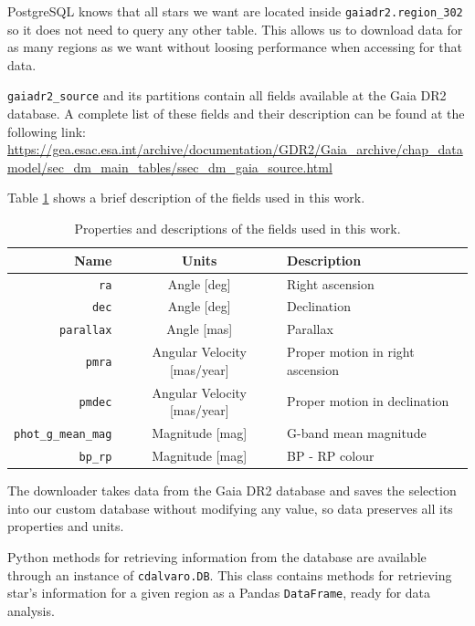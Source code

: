 \documentclass[11pt, a4paper, english]{book}
\begin{document}
PostgreSQL knows that all stars we want are located inside \verb|gaiadr2.region_302| so it does not need to query any other table.
This allows us to download data for as many regions as we want without loosing performance when accessing for that data.

\verb|gaiadr2_source| and its partitions contain all fields available at the Gaia DR2 database.
A complete list of these fields and their description can be found at the following link:
\sloppy\url{https://gea.esac.esa.int/archive/documentation/GDR2/Gaia_archive/chap_datamodel/sec_dm_main_tables/ssec_dm_gaia_source.html}

Table \ref{tab:important_fields} shows a brief description of the fields used in this work.

\begin{table}[h!]
  \begin{center}
    \begin{tabular}{r|c|l}
      \textbf{Name} & \textbf{Units} & \textbf{Description} \\
      \hline
      \verb|ra| & Angle [deg] & Right ascension \\
      \verb|dec| & Angle [deg] & Declination \\
      \verb|parallax| & Angle [mas] & Parallax \\
      \verb|pmra| & Angular Velocity [mas/year] & Proper motion in right ascension \\
      \verb|pmdec| & Angular Velocity [mas/year] & Proper motion in declination \\
      \verb|phot_g_mean_mag| & Magnitude [mag] & G-band mean magnitude \\
      \verb|bp_rp| & Magnitude [mag] & BP - RP colour \\
    \end{tabular}
    \caption{Properties and descriptions of the fields used in this work.}
    \label{tab:important_fields}
  \end{center}
\end{table}

The downloader takes data from the Gaia DR2 database and saves the selection into our custom database without modifying any value,
so data preserves all its properties and units.

Python methods for retrieving information from the database are available through an instance of \verb|cdalvaro.DB|.
This class contains methods for retrieving star's information for a given region as a Pandas \verb|DataFrame|, ready for data analysis.
\end{document}
